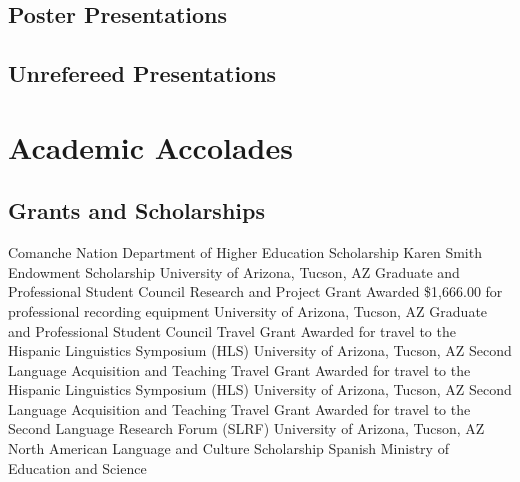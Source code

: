 \documentclass[11pt,letterpaper]{moderncv}
\begin{document}
\subsection{Poster Presentations}

\subsection{Unrefereed Presentations}





\section{Academic Accolades}

\subsection{Grants and Scholarships}

        {Comanche Nation Department of Higher Education Scholarship}
        {}
        {}
        {}
        {}
        {}
        {Karen Smith Endowment Scholarship}
        {}
        {}
        {}
        {University of Arizona, Tucson, AZ}
        {Graduate and Professional Student Council Research and Project Grant}
        {\newline Awarded \$1,666.00 for professional recording equipment}
        {}
        {}
        {University of Arizona, Tucson, AZ}
        {Graduate and Professional Student Council Travel Grant}
        {\newline Awarded for travel to the Hispanic Linguistics Symposium (HLS)}
        {}
        {}
        {University of Arizona, Tucson, AZ}
        {Second Language Acquisition and Teaching Travel Grant}
        {\newline Awarded for travel to the Hispanic Linguistics Symposium (HLS)}
        {}
        {}
        {University of Arizona, Tucson, AZ}
        {Second Language Acquisition and Teaching Travel Grant}
        {\newline Awarded for travel to the Second Language Research Forum (SLRF)}
        {}
        {}
        {University of Arizona, Tucson, AZ}
        {North American Language and Culture Scholarship}
        {}
        {}
        {}
        {Spanish Ministry of Education and Science}
\end{document}
